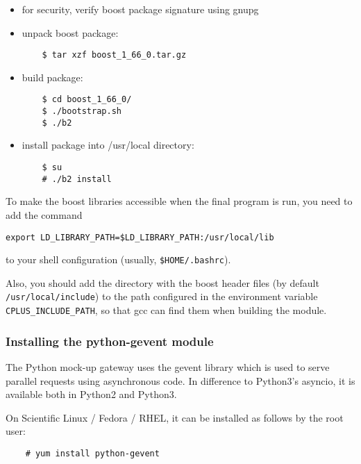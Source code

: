 \documentclass{scrartcl}[12pt,a4paper]
\begin{document}
\begin{itemize}
\item for security, verify boost package signature using gnupg

\item unpack boost package:
  
  \begin{verbatim}
    $ tar xzf boost_1_66_0.tar.gz
  \end{verbatim}    

\item build package:

  \begin{verbatim}
    $ cd boost_1_66_0/
    $ ./bootstrap.sh
    $ ./b2
  \end{verbatim}    

\item install package into /usr/local directory:

  \begin{verbatim}
    $ su
    # ./b2 install
  \end{verbatim}    
\end{itemize}

To make the boost libraries accessible when the
final program is run, you need to add the
command

\begin{verbatim}
export LD_LIBRARY_PATH=$LD_LIBRARY_PATH:/usr/local/lib
\end{verbatim}

to your shell configuration (usually, \verb+$HOME/.bashrc+).

Also, you should add the directory with the boost header files (by
default \verb+/usr/local/include+) to the path configured in the environment
variable \verb+CPLUS_INCLUDE_PATH+, so that gcc can find them when building
the module.

\subsubsection{Installing the python-gevent module}

The Python mock-up gateway uses the gevent
library which is used to serve parallel requests
using asynchronous code. In difference to
Python3's asyncio, it is available both in
Python2 and Python3.

On Scientific Linux / Fedora / RHEL, it can be installed
as follows by the root user:

  \begin{verbatim}
    # yum install python-gevent
  \end{verbatim}    
\end{document}
